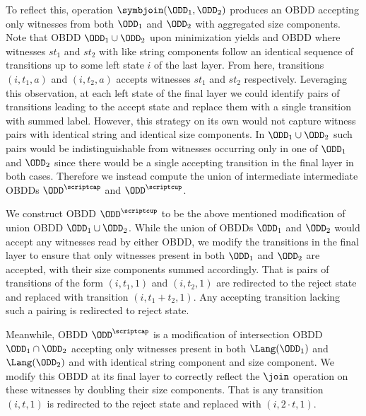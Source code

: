 To reflect this, operation $\symbjoin(\ODD_1,\ODD_2) $ produces an OBDD accepting only witnesses from both $\ODD_1$ and $\ODD_2$ with aggregated size components. Note that OBDD $\ODD_1 \cup \ODD_2$ upon minimization yields and OBDD where witnesses $st_1$ and $st_2$ with like string components follow an identical sequence of transitions up to some left state $i$ of the last layer. From here, transitions $(i,t_1,a)$ and $(i,t_2,a)$ accepts witnesses $st_1$ and $st_2$ respectively. Leveraging this observation, at each left state of the final layer we could identify pairs of transitions leading to the accept state and replace them with a single transition with summed label. However, this strategy on its own would not capture witness pairs with identical string and identical size components. In $\ODD_1 \cup \ODD_2$ such pairs would be indistinguishable from witnesses occurring only in one of $\ODD_1$ and $\ODD_2$ since there would be a single accepting transition in the final layer in both cases.
Therefore we instead compute the union of intermediate intermediate OBDDs $\ODD^{\scriptcap}$ and $\ODD^{\scriptcup}$. 

We construct OBDD $\ODD^{\scriptcup}$ to be the above mentioned modification of union OBDD $\ODD_1 \cup \ODD_2$. While the union of OBDDs $\ODD_1$ and $\ODD_2$ would accept any witnesses read by either OBDD, we modify the transitions in the final layer to ensure that only witnesses present in both $\ODD_1$ and $\ODD_2$ are accepted, with their size components summed accordingly. That is pairs of transitions of the form $(i,t_1,1)$ and $(i,t_2,1)$ are redirected to the reject state and replaced with transition $(i,t_1 +t_2,1)$. Any accepting transition lacking such a pairing is redirected to reject state.

Meanwhile, OBDD $\ODD^{\scriptcap}$ is a modification of intersection OBDD $\ODD_1 \cap \ODD_2$ accepting only witnesses present in both $\Lang(\ODD_1)$ and $\Lang(\ODD_2)$ and with identical string component and size component. We modify this OBDD at its final layer to correctly reflect the $\join$ operation on these witnesses by doubling their size components. That is any transition $(i,t,1)$ is redirected to the reject state and replaced with $(i,2\cdot t,1)$.



